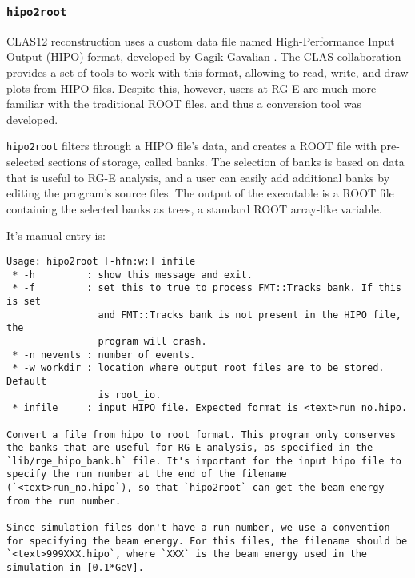 \subsubsection{\texttt{hipo2root}}
    CLAS12 reconstruction uses a custom data file named High-Performance Input Output (HIPO) format, developed by Gagik Gavalian \cite{chekanov2021}.
    The CLAS collaboration provides a set of tools to work with this format, allowing to read, write, and draw plots from HIPO files.
    Despite this, however, users at RG-E are much more familiar with the traditional ROOT files, and thus a conversion tool was developed.

    \texttt{hipo2root} filters through a HIPO file's data, and creates a ROOT file with pre-selected sections of storage, called banks.
    The selection of banks is based on data that is useful to RG-E analysis, and a user can easily add additional banks by editing the program's source files.
    The output of the executable is a ROOT file containing the selected banks as trees, a standard ROOT array-like variable.

    It's manual entry is:
    \begin{lstlisting}
Usage: hipo2root [-hfn:w:] infile
 * -h         : show this message and exit.
 * -f         : set this to true to process FMT::Tracks bank. If this is set
                and FMT::Tracks bank is not present in the HIPO file, the
                program will crash.
 * -n nevents : number of events.
 * -w workdir : location where output root files are to be stored. Default
                is root_io.
 * infile     : input HIPO file. Expected format is <text>run_no.hipo.

Convert a file from hipo to root format. This program only conserves the banks that are useful for RG-E analysis, as specified in the `lib/rge_hipo_bank.h` file. It's important for the input hipo file to specify the run number at the end of the filename (`<text>run_no.hipo`), so that `hipo2root` can get the beam energy from the run number.

Since simulation files don't have a run number, we use a convention for specifying the beam energy. For this files, the filename should be `<text>999XXX.hipo`, where `XXX` is the beam energy used in the simulation in [0.1*GeV].
    \end{lstlisting}
